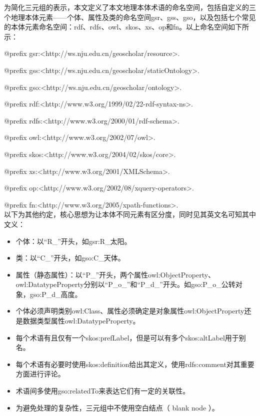 为简化三元组的表示，本文定义了本文地理本体术语的命名空间，包括自定义的三个地理本体元素——个体、属性及类的命名空间gsr、gss、gso，以及包括七个常见的本体元素命名空间：rdf、rdfs、owl、skos、xs、op和fn。以上命名空间如下所示：


@prefix gsr:\hphantom{sss}<http://ws.nju.edu.cn/geoscholar/resource>.

@prefix gss:\hphantom{sss}<http://ws.nju.edu.cn/geoscholar/staticOntology>.

@prefix gso:\hphantom{ssl}<http://ws.nju.edu.cn/geoscholar/ontology>.

@prefix rdf:\hphantom{sss}<http://www.w3.org/1999/02/22-rdf-syntax-ns>.

@prefix rdfs:\hphantom{ss}<http://www.w3.org/2000/01/rdf-schema>.

@prefix owl:\hphantom{ss}<http://www.w3.org/2002/07/owl>.

@prefix skos:\hphantom{ll}<http://www.w3.org/2004/02/skos/core>.

@prefix xs:\hphantom{sssl}<http://www.w3.org/2001/XMLSchema>.

@prefix op:\hphantom{ssll}<http://www.w3.org/2002/08/xquery-operators>.

@prefix fn:\hphantom{sssl}<http://www.w3.org/2005/xpath-functions>.\linebreak[3]
\\
以下为其他约定，核心思想为让本体不同元素有区分度，同时见其英文名可知其中文义：
\begin{itemize}
	\item {个体：以“R\_”开头，如gsr:R\_太阳。
	}
	\item {类：以“C\_”开头，如gso:C\_天体。
	}
	\item{属性（静态属性）：以“P\_”开头，两个属性owl:ObjectProperty、owl:DatatypeProperty分别以“P\_o\_”和“P\_d\_”开头。如gso:P\_o\_公转对象，gso:P\_d\_高度。
	}
	\item{个体必须声明类别owl:Class、属性必须确定是对象属性owl:ObjectProperty还是数据类型属性owl:DatatypeProperty。
	}
	\item{每个术语有且仅有一个skos:prefLabel，但是可以有多个skos:altLabel用于别名。
	}
	\item {每个术语有必要时使用skos:definition给出其定义，使用rdfs:comment对其重要方面进行评论。
	}
	\item {术语间多使用gso:relatedTo来表达它们有一定的关联性。
	}
	\item {为避免处理的复杂性，三元组中不使用空白结点（ blank node ）。
	}
\end{itemize}

